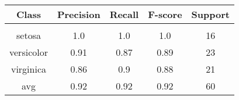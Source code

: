\begin{table}
\begin{tabular}{c | c c c c}
Class & Precision & Recall & F-score & Support\\
\hline
\hline\\
setosa & 1.0 & 1.0 & 1.0 & 16\\
versicolor & 0.91 & 0.87 & 0.89 & 23\\
virginica & 0.86 & 0.9 & 0.88 & 21\\
avg & 0.92 & 0.92 & 0.92 & 60\\
\end{tabular}
\end{table}
